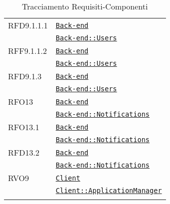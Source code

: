 \begin{longtable}{|>{\centering}m{3cm}|m{10cm}<{\centering}|}
RFD9.1.1.1 & \hyperref[Back-end]{\texttt{Back-end}}\\
& \hyperref[Back-end::Users]{\texttt{Back-end::Users}}\\ \hline

RFF9.1.1.2 & \hyperref[Back-end]{\texttt{Back-end}}\\
& \hyperref[Back-end::Users]{\texttt{Back-end::Users}}\\ \hline

RFD9.1.3 & \hyperref[Back-end]{\texttt{Back-end}}\\
& \hyperref[Back-end::Users]{\texttt{Back-end::Users}}\\ \hline

RFO13 & \hyperref[Back-end]{\texttt{Back-end}}\\
& \hyperref[Back-end::Notifications]{\texttt{Back-end::Notifications}}\\ \hline

RFO13.1 & \hyperref[Back-end]{\texttt{Back-end}}\\
& \hyperref[Back-end::Notifications]{\texttt{Back-end::Notifications}}\\ \hline

RFD13.2 & \hyperref[Back-end]{\texttt{Back-end}}\\
& \hyperref[Back-end::Notifications]{\texttt{Back-end::Notifications}}\\ \hline

RVO9 & \hyperref[Client]{\texttt{Client}}\\
& \hyperref[Client::ApplicationManager]{\texttt{Client::ApplicationManager}}\\ \hline

\caption[Tracciamento Requisiti-Componenti]{Tracciamento Requisiti-Componenti}
\label{tabella:requi-pack}
\end{longtable}
\clearpage
